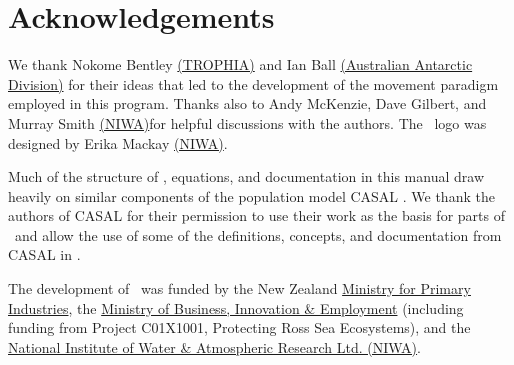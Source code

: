 \section{Acknowledgements\label{sec:acknowledgements}}

We thank Nokome Bentley \href{http://www.trophia.co.nz}{(TROPHIA)} and Ian Ball \href{http://www.aad.gov.au}{(Australian Antarctic Division)} for their ideas that led to the development of the movement paradigm employed in this program. Thanks also to Andy McKenzie, Dave Gilbert, and Murray Smith \href{http://www.niwa.co.nz}{(NIWA)}for  helpful discussions with the authors. The \SPM\ logo was designed by Erika Mackay \href{http://www.niwa.co.nz}{(NIWA)}. 

Much of the structure of \SPM, equations, and documentation in this manual draw heavily on similar components of the population model CASAL \citep{1388}. We thank the authors of CASAL for their permission to use their work as the basis for parts of \SPM\ and allow the use of some of the definitions, concepts, and documentation from CASAL in \SPM. 

The development of \SPM\ was funded by the New Zealand \href{http://www.mpi.govt.nz}{Ministry for Primary Industries}, the \href{http://www.msi.govt.nz}{Ministry of Business, Innovation \& Employment} (including funding from Project C01X1001, Protecting Ross Sea Ecosystems), and the \href{http://www.niwa.co.nz}{National Institute of Water \& Atmospheric Research Ltd. (NIWA)}. 
